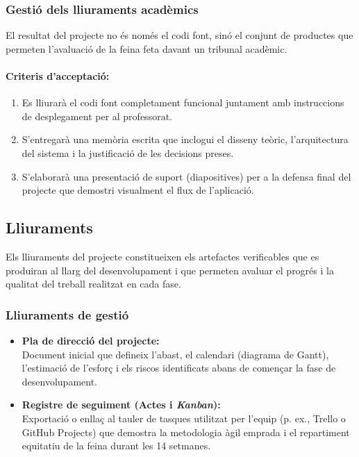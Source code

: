 \subsubsection{Gestió dels lliuraments acadèmics}

El resultat del projecte no és només el codi font, sinó el conjunt de productes que permeten l'avaluació de la feina feta davant un tribunal acadèmic.

\paragraph{Criteris d'acceptació:}
\begin{enumerate}[label=\roman*.]
    \item Es lliurarà el codi font completament funcional juntament amb instruccions de desplegament per al professorat.
    \item S'entregarà una memòria escrita que inclogui el disseny teòric, l'arquitectura del sistema i la justificació de les decisions preses.
    \item S'elaborarà una presentació de suport (diapositives) per a la defensa final del projecte que demostri visualment el flux de l'aplicació.
\end{enumerate}

\subsection{Lliuraments}

Els lliuraments del projecte constitueixen els artefactes verificables que es produiran al llarg del desenvolupament i que permeten avaluar el progrés i la qualitat del treball realitzat en cada fase.

\subsubsection{Lliuraments de gestió}
\begin{itemize}
    \item \textbf{Pla de direcció del projecte:} \\ Document inicial que defineix l'abast, el calendari (diagrama de Gantt), l'estimació de l'esforç i els riscos identificats abans de començar la fase de desenvolupament.
    
    \item \textbf{Registre de seguiment (Actes i \textit{Kanban}):} \\ Exportació o enllaç al tauler de tasques utilitzat per l'equip (p. ex., Trello o GitHub Projects) que demostra la metodologia àgil emprada i el repartiment equitatiu de la feina durant les 14 setmanes.
\end{itemize}

